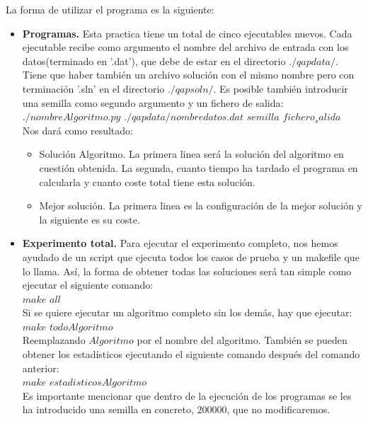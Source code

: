 La forma de utilizar el programa es la siguiente:\\

\begin{itemize}
	\item \textbf{Programas.} Esta practica tiene un total de cinco ejecutables nuevos. Cada ejecutable recibe como argumento el nombre del archivo de entrada con los datos(terminado en '.dat'), que debe de estar en el directorio $./qapdata/$. Tiene que haber también un archivo solución con el mismo nombre pero con terminación '.sln'  en el directorio $./qapsoln/$. Es posible también introducir una semilla como segundo argumento y un fichero de salida:\\
	
	$./nombreAlgoritmo.py$ $./qapdata/nombredatos.dat$ $semilla$ $fichero_salida$\\
	
	Nos dará como resultado:\\
	\begin{itemize}
		\item Solución Algoritmo. La primera linea será la solución del algoritmo en cuestión obtenida. La segunda, cuanto tiempo ha tardado el programa en calcularla y cuanto coste total tiene esta solución.
		\item Mejor solución. La primera linea es la configuración de la mejor solución y la siguiente es su coste.
	\end{itemize}
	
	\item \textbf{Experimento total.} Para ejecutar el experimento completo, nos hemos ayudado de un script que ejecuta todos los casos de prueba y un makefile que lo llama. Así, la forma de obtener todas las soluciones será tan simple como ejecutar el siguiente comando:\\
	
	$make$ $all$\\
	
	Si se quiere ejecutar un algoritmo completo sin los demás, hay que ejecutar:\\
	
	$make$ $todoAlgoritmo$\\
	
	Reemplazando $Algoritmo$ por el nombre del algoritmo. También se pueden obtener los estadísticos ejecutando el siguiente comando después del comando anterior:\\
	
	$make$ $estadisticosAlgoritmo$\\
	
	
	Es importante mencionar que dentro de la ejecución de los programas se les ha introducido una semilla en concreto, $200000$, que no modificaremos.\\
	
	
\end{itemize}

